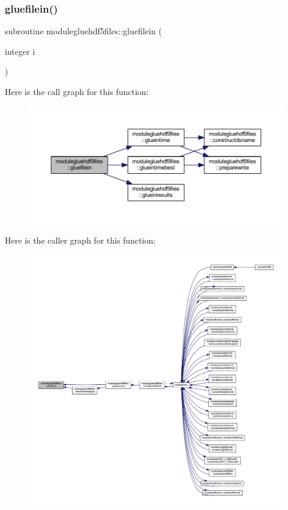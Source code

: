 \subsubsection{\texorpdfstring{gluefilein()}{gluefilein()}}
{\footnotesize\ttfamily subroutine modulegluehdf5files\+::gluefilein (\begin{DoxyParamCaption}\item[{integer}]{i }\end{DoxyParamCaption})\hspace{0.3cm}{\ttfamily [private]}}

Here is the call graph for this function\+:\nopagebreak
\begin{figure}[H]
\begin{center}
\leavevmode
\includegraphics[width=350pt]{namespacemodulegluehdf5files_a102906b766caaf9abc74b0c0de97ab0c_cgraph}
\end{center}
\end{figure}
Here is the caller graph for this function\+:\nopagebreak
\begin{figure}[H]
\begin{center}
\leavevmode
\includegraphics[width=350pt]{namespacemodulegluehdf5files_a102906b766caaf9abc74b0c0de97ab0c_icgraph}
\end{center}
\end{figure}
\mbox{\label{namespacemodulegluehdf5files_a3433c6674efedbc9d8386001b56ecbfd}} 

